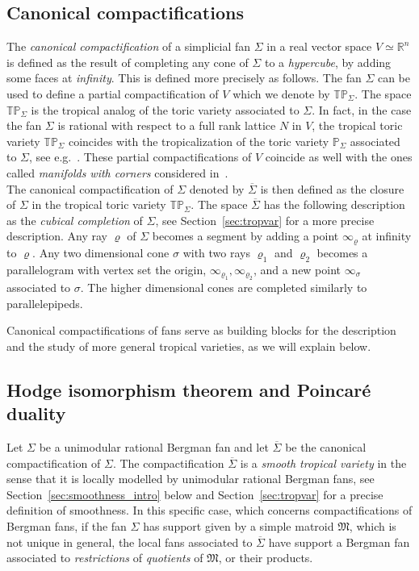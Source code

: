 \documentclass[11pt]{amsart}
\theoremstyle{definition}
\numberwithin{equation}{section}
\renewcommand{\~}{\widetilde}
\newcommand{\R}{\mathbb{R}}
\renewcommand{\P}{\mathbb P} %
\newcommand{\TP}{\mathbb{TP}} %
\newcommand{\comp}[1]{\overline{#1}} %
\newcommand{\Ma}{\mathfrak M} %
\begin{document}
\subsection{Canonical compactifications} The \emph{canonical compactification} of a simplicial fan $\Sigma$ in a real vector space $V \simeq \R^n$ is defined as the result of completing any cone of $\Sigma$ to a \emph{hypercube}, by adding some faces at \emph{infinity}. This is defined more precisely as follows. The fan $\Sigma$ can be used to define a partial compactification of $V$ which we denote by $\TP_\Sigma$. The space $\TP_\Sigma$ is the tropical analog of the toric variety associated to $\Sigma$. In fact, in the case the fan $\Sigma$ is rational with respect to a full rank lattice $N$ in $V$, the tropical toric variety $\TP_\Sigma$ coincides with the tropicalization of the toric variety $\P_\Sigma$ associated to $\Sigma$, see e.g.~\cites{Payne, Thuillier}. These partial compactifications of $V$ coincide as well with the ones called \emph{manifolds with corners} considered in~\cites{AMRT, Oda}.\\
The canonical compactification of $\Sigma$ denoted by $\comp \Sigma$ is then defined as the closure of $\Sigma$ in the tropical toric variety $\TP_\Sigma$. The space $\comp\Sigma$ has the following description as the \emph{cubical completion} of $\Sigma$, see Section~\ref{sec:tropvar} for a more precise description. Any ray $\varrho$ of $\Sigma$ becomes a segment by adding a point $\infty_\varrho$ at infinity to $\varrho$. Any two dimensional cone $\sigma$ with two rays $\varrho_1$ and $\varrho_2$ becomes a parallelogram with vertex set the origin, $\infty_{\varrho_{1}}, \infty_{\varrho_2}$, and a new point $\infty_\sigma$ associated to $\sigma$. The higher dimensional cones are completed similarly to parallelepipeds.

\medskip

Canonical compactifications of fans serve as building blocks for the description and the study of more general tropical varieties, as we will explain below.



\subsection{Hodge isomorphism theorem and Poincar\'e duality} \label{sec:poincareduality}
Let $\Sigma$ be a unimodular rational Bergman fan and let $\comp \Sigma$ be the canonical compactification of $\Sigma$.
The compactification $\comp \Sigma$ is a \emph{smooth tropical variety} in the sense that it is locally modelled by unimodular rational Bergman fans, see Section~\ref{sec:smoothness_intro} below and Section~\ref{sec:tropvar} for a precise definition of smoothness. In this specific case, which concerns compactifications of Bergman fans, if the fan $\Sigma$ has support given by a simple matroid $\Ma$, which is not unique in general, the local fans associated to $\comp \Sigma$ have support a Bergman fan associated to \emph{restrictions} of \emph{quotients} of $\Ma$, or their products.
\end{document}
